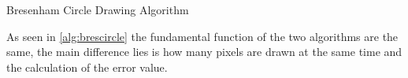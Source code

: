 \begin{algorithm}[H]
	
	\SetAlgoLined
	\caption{Bresenham Circle Drawing Algorithm}
	\label{alg:brescircle}
\end{algorithm}

As seen in \cref{alg:brescircle} the fundamental function of the two algorithms are the same, the main difference lies is how many pixels are drawn at the same time and the calculation of the error value.

